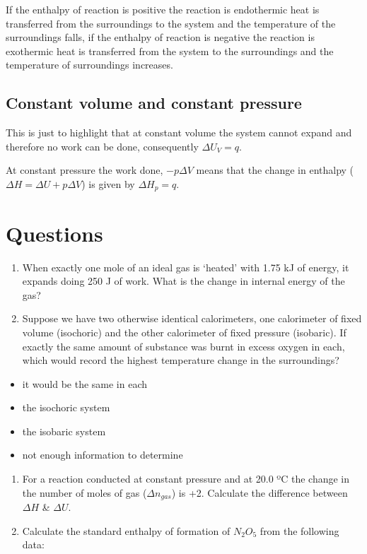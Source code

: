 \documentclass[
]{book}
\providecommand{\tightlist}{%
  \setlength{\itemsep}{0pt}\setlength{\parskip}{0pt}}
\begin{document}
If the enthalpy of reaction is positive the reaction is endothermic heat is transferred from the surroundings to the system and the temperature of the surroundings falls, if the enthalpy of reaction is negative the reaction is exothermic heat is transferred from the system to the surroundings and the temperature of surroundings increases.

\hypertarget{constant-volume-and-constant-pressure}{%
\subsection{Constant volume and constant pressure}\label{constant-volume-and-constant-pressure}}

This is just to highlight that at constant volume the system cannot expand and therefore no work can be done, consequently \(\Delta U_V = q\).

At constant pressure the work done, \(-p \Delta V\) means that the change in enthalpy (\(\Delta H = \Delta U + p \Delta V\)) is given by \(\Delta H_p=q\).

\hypertarget{questions}{%
\section{Questions}\label{questions}}

\begin{enumerate}
\def\labelenumi{\arabic{enumi}.}
\item
  When exactly one mole of an ideal gas is `heated' with 1.75 kJ of energy, it expands doing 250 J of work. What is the change in internal energy of the gas?
\item
  Suppose we have two otherwise identical calorimeters, one calorimeter of fixed volume (isochoric) and the other calorimeter of fixed pressure (isobaric). If exactly the same amount of substance was burnt in excess oxygen in each, which would record the highest temperature change in the surroundings?
\end{enumerate}

\begin{itemize}
\tightlist
\item
  it would be the same in each
\item
  the isochoric system
\item
  the isobaric system
\item
  not enough information to determine
\end{itemize}

\begin{enumerate}
\def\labelenumi{\arabic{enumi}.}
\setcounter{enumi}{2}
\item
  For a reaction conducted at constant pressure and at 20.0 ºC the change in the number of moles of gas (\(\Delta n_{gas}\)) is +2. Calculate the difference between \(\Delta H\) \& \(\Delta U\).
\item
  Calculate the standard enthalpy of formation of \(N_2 O_5\) from the following data:
\end{enumerate}
\end{document}
